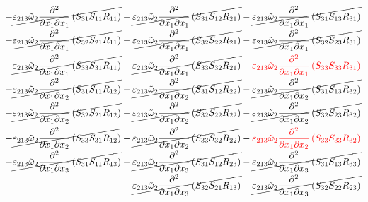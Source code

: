 \begin{equation}
	\begin{split}
		-\cancel{\varepsilon_{213}\tilde{\omega}_{2}\pdv{}{x_{1}}{x_{1}}\left(S_{31}S_{11}R_{11}\right)}
		-\cancel{\varepsilon_{213}\tilde{\omega}_{2}\pdv{}{x_{1}}{x_{1}}\left(S_{31}S_{12}R_{21}\right)}
		-\cancel{\varepsilon_{213}\tilde{\omega}_{2}\pdv{}{x_{1}}{x_{1}}\left(S_{31}S_{13}R_{31}\right)}\\
		-\cancel{\varepsilon_{213}\tilde{\omega}_{2}\pdv{}{x_{1}}{x_{1}}\left(S_{32}S_{21}R_{11}\right)}
		-\cancel{\varepsilon_{213}\tilde{\omega}_{2}\pdv{}{x_{1}}{x_{1}}\left(S_{32}S_{22}R_{21}\right)}
		-\cancel{\varepsilon_{213}\tilde{\omega}_{2}\pdv{}{x_{1}}{x_{1}}\left(S_{32}S_{23}R_{31}\right)}\\
		-\cancel{\varepsilon_{213}\tilde{\omega}_{2}\pdv{}{x_{1}}{x_{1}}\left(S_{33}S_{31}R_{11}\right)}
		-\cancel{\varepsilon_{213}\tilde{\omega}_{2}\pdv{}{x_{1}}{x_{1}}\left(S_{33}S_{32}R_{21}\right)}
		-{\color{red}\varepsilon_{213}\tilde{\omega}_{2}\pdv{}{x_{1}}{x_{1}}\left(S_{33}S_{33}R_{31}\right)}\\
		-\cancel{\varepsilon_{213}\tilde{\omega}_{2}\pdv{}{x_{1}}{x_{2}}\left(S_{31}S_{11}R_{12}\right)}
		-\cancel{\varepsilon_{213}\tilde{\omega}_{2}\pdv{}{x_{1}}{x_{2}}\left(S_{31}S_{12}R_{22}\right)}
		-\cancel{\varepsilon_{213}\tilde{\omega}_{2}\pdv{}{x_{1}}{x_{2}}\left(S_{31}S_{13}R_{32}\right)}\\
		-\cancel{\varepsilon_{213}\tilde{\omega}_{2}\pdv{}{x_{1}}{x_{2}}\left(S_{32}S_{21}R_{12}\right)}
		-\cancel{\varepsilon_{213}\tilde{\omega}_{2}\pdv{}{x_{1}}{x_{2}}\left(S_{32}S_{22}R_{22}\right)}
		-\cancel{\varepsilon_{213}\tilde{\omega}_{2}\pdv{}{x_{1}}{x_{2}}\left(S_{32}S_{23}R_{32}\right)}\\
		-\cancel{\varepsilon_{213}\tilde{\omega}_{2}\pdv{}{x_{1}}{x_{2}}\left(S_{33}S_{31}R_{12}\right)}
		-\cancel{\varepsilon_{213}\tilde{\omega}_{2}\pdv{}{x_{1}}{x_{2}}\left(S_{33}S_{32}R_{22}\right)}
		-{\color{red}\varepsilon_{213}\tilde{\omega}_{2}\pdv{}{x_{1}}{x_{2}}\left(S_{33}S_{33}R_{32}\right)}\\
		-\cancel{\varepsilon_{213}\tilde{\omega}_{2}\pdv{}{x_{1}}{x_{3}}\left(S_{31}S_{11}R_{13}\right)}
		-\cancel{\varepsilon_{213}\tilde{\omega}_{2}\pdv{}{x_{1}}{x_{3}}\left(S_{31}S_{12}R_{23}\right)}
		-\cancel{\varepsilon_{213}\tilde{\omega}_{2}\pdv{}{x_{1}}{x_{3}}\left(S_{31}S_{13}R_{33}\right)}\\
		-\cancel{\varepsilon_{213}\tilde{\omega}_{2}\pdv{}{x_{1}}{x_{3}}\left(S_{32}S_{21}R_{13}\right)}
		-\cancel{\varepsilon_{213}\tilde{\omega}_{2}\pdv{}{x_{1}}{x_{3}}\left(S_{32}S_{22}R_{23}\right)}

\end{split}
\end{equation}
